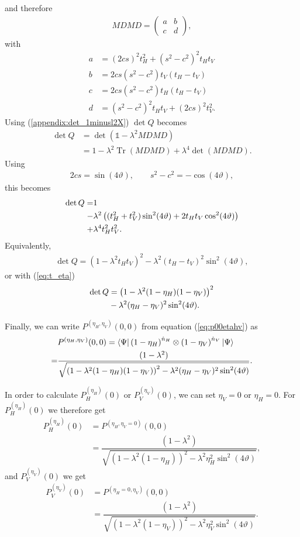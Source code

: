 \documentclass[%
 reprint,
 amsmath,amssymb,
 aps,
twocolumn
]{revtex4-2}
\DeclareMathOperator{\Tr}{Tr}
\begin{document}
and therefore
\begin{align}\label{eq:mdmd_abbreviation}
MDMD=
\begin{pmatrix}
a &
b
\\
c &
d
\end{pmatrix},
\end{align}
with
\begin{align}
a&=(2cs)^2t_H^2+(s^2-c^2)^2t_Ht_V\\
b&=2cs(s^2-c^2)t_V(t_H-t_V)\\
c&=2cs(s^2-c^2)t_H(t_H-t_V)\\
d&=(s^2-c^2)^2t_Ht_V+(2cs)^2t_V^2.
\end{align}
Using (\ref{appendix:det_1minusl2X}) $\det Q$ becomes
\begin{align}
\det Q
&=\det\!\left(\mathbb{1}-\lambda^2MDMD\right)\\
&=
1-\lambda^2\Tr(MDMD)
+\lambda^4 \det(MDMD).
\end{align}
Using
\begin{align}
2cs=\sin(4\vartheta),
\qquad
s^2-c^2=-\cos(4\vartheta),
\end{align}
this becomes
\begin{align}
\det Q
=
&1\notag\\
-&\lambda^2\left((t_H^2+t_V^2)\sin^2(4\vartheta)+2t_Ht_V\cos^2(4\vartheta)\right)\notag\\
+&\lambda^4 t_H^2t_V^2.
\end{align}
Equivalently,
\begin{align}
\det Q
=
(1-\lambda^2 t_Ht_V)^2
-\lambda^2(t_H-t_V)^2\sin^2(4\vartheta),
\end{align}
or with (\ref{eq:t_eta})
\begin{align}
\det Q
&=
\left(1-\lambda^2(1-\eta_H)(1-\eta_V)\right)^2\notag\\
&-\lambda^2(\eta_H-\eta_V)^2\sin^2(4\vartheta).
\end{align}

Finally, we can write $P^{(\eta_H,\eta_V)}(0,0)$ from equation (\ref{eq:p00etahv}) as
\begin{align}
&P^{(\eta_H,\eta_V)}(0,0)=\bra{\Psi}\left(1-\eta_H\right)^{\hat{n}_H}\otimes \left(1-\eta_V\right)^{\hat{n}_V}\ket{\Psi}\notag\\
=&\dfrac{(1-\lambda^2)}{\sqrt{\left(1-\lambda^2(1-\eta_H)(1-\eta_V)\right)^2-\lambda^2(\eta_H-\eta_V)^2\sin^2(4\vartheta)}}.
\end{align}

In order to calculate $P^{(\eta_{H})}_{H}(0)$ or $P^{(\eta_{V})}_{V}(0)$, we can set $\eta_{V}=0$ or $\eta_{H}=0$. For $P^{(\eta_{H})}_{H}(0)$ we therefore get
\begin{align}
P^{(\eta_{H})}_{H}(0)&=P^{(\eta_H,\eta_V=0)}(0,0)\\
&=\dfrac{(1-\lambda^2)}{\sqrt{\left(1-\lambda^2(1-\eta_H)\right)^2-\lambda^2\eta_H^2\sin^2(4\vartheta)}},
\end{align}
and $P^{(\eta_{V})}_{V}(0)$ we get
\begin{align}
P^{(\eta_{V})}_{V}(0)&=P^{(\eta_H=0,\eta_V)}(0,0)\\
&=\dfrac{(1-\lambda^2)}{\sqrt{\left(1-\lambda^2(1-\eta_V)\right)^2-\lambda^2\eta_V^2\sin^2(4\vartheta)}}.
\end{align}
\end{document}
